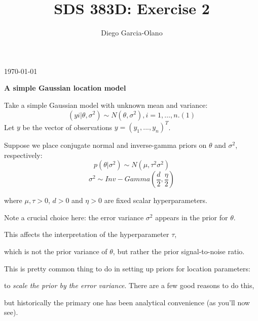 \documentclass{homework}
\title{SDS 383D: Exercise 2}
\author{Diego Garcia-Olano}
\begin{document}
\makeatletter
\begin{titlepage}
	\vspace*{\fill}
	\centering
	{\huge \@title \par}
	\vskip0.5cm
	{\large \@author \par}
	\vskip0.5cm
	{\large \today \par}
	\vspace*{\fill}
\end{titlepage}
\makeatother

\newpage 
\mbox{}
\thispagestyle{empty}
\newpage

\setcounter{page}{1}


\par \textbf{A simple Gaussian location model}
\par Take a simple Gaussian model with unknown mean and variance:
$$(yi | \theta,\sigma^2) \sim N(\theta,\sigma^2) , i = 1,\dots,n. (1)$$
Let $y$ be the vector of observations $y = (y_1, . . . , y_n)^T$.\\

\par Suppose we place conjugate normal and inverse-gamma priors on $\theta$  and $\sigma^2$, respectively:
$$p(\theta | \sigma^2) \sim N(\mu, \tau^2\sigma^2 )$$
$$\sigma^2 \sim Inv-Gamma(\frac{d}{2}, \frac{\eta}{2} )$$
\par where $\mu, \tau > 0$, $d > 0$ and $\eta > 0$ are fixed scalar hyperparameters.\\

\par *Note a crucial choice here: the error variance $\sigma^2$ appears in the prior for $\theta$. 
\par This affects the interpretation of the hyperparameter $\tau$, \par which is not the prior variance of $\theta$, but rather the prior signal-to-noise ratio.\par This is pretty common thing to do in setting up priors for location parameters: \par to \textit{ scale the prior by the error variance}. There are a few good reasons to do this, \par but historically the primary one has been analytical convenience (as you'll now see). \\
\end{document}
